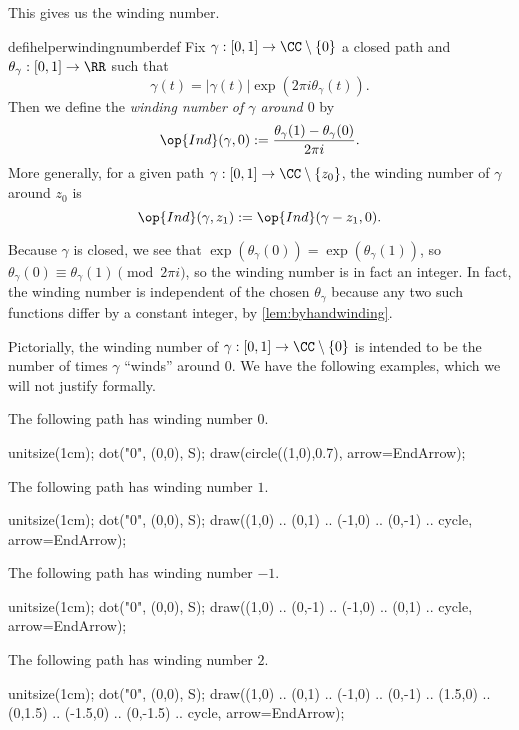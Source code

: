 This gives us the winding number.
\begin{restatable}{defihelper}{windingnumberdef} 
	Fix $\gamma:[0,1]\to\CC\setminus\{0\}$ a closed path and $\theta_\gamma:[0,1]\to\RR$ such that
	\[\gamma(t)=|\gamma(t)|\exp(2\pi i\theta_\gamma(t)).\]
	Then we define the \textit{winding number of $\gamma$ around $0$} by
	\[\op{Ind}(\gamma,0):=\frac{\theta_\gamma(1)-\theta_\gamma(0)}{2\pi i}.\]
	More generally, for a given path $\gamma:[0,1]\to\CC\setminus\{z_0\}$, the winding number of $\gamma$ around $z_0$ is
	\[\op{Ind}(\gamma,z_1):=\op{Ind}(\gamma-z_1,0).\]
\end{restatable}
\begin{remark}
	Because $\gamma$ is closed, we see that $\exp(\theta_\gamma(0))=\exp(\theta_\gamma(1))$, so $\theta_\gamma(0)\equiv\theta_\gamma(1)\pmod{2\pi i}$, so the winding number is in fact an integer. In fact, the winding number is independent of the chosen $\theta_\gamma$ because any two such functions differ by a constant integer, by \autoref{lem:byhandwinding}.
\end{remark}
Pictorially, the winding number of $\gamma:[0,1]\to\CC\setminus\{0\}$ is intended to be the number of times $\gamma$ ``winds'' around $0$. We have the following examples, which we will not justify formally.
\begin{example}
	The following path has winding number $0$.
	\begin{center}
		\begin{asy}
			unitsize(1cm);
			dot("$0$", (0,0), S);
			draw(circle((1,0),0.7), arrow=EndArrow);
		\end{asy}
	\end{center}
\end{example}
\begin{example}
	The following path has winding number $1$.
	\begin{center}
		\begin{asy}
			unitsize(1cm);
			dot("$0$", (0,0), S);
			draw((1,0) .. (0,1) .. (-1,0) .. (0,-1) .. cycle, arrow=EndArrow);
		\end{asy}
	\end{center}
\end{example}
\begin{example}
	The following path has winding number $-1$.
	\begin{center}
		\begin{asy}
			unitsize(1cm);
			dot("$0$", (0,0), S);
			draw((1,0) .. (0,-1) .. (-1,0) .. (0,1) .. cycle, arrow=EndArrow);
		\end{asy}
	\end{center}
\end{example}
\begin{example}
	The following path has winding number $2$.
	\begin{center}
		\begin{asy}
			unitsize(1cm);
			dot("$0$", (0,0), S);
			draw((1,0) .. (0,1) .. (-1,0) .. (0,-1) .. (1.5,0) .. (0,1.5) .. (-1.5,0) .. (0,-1.5) .. cycle, arrow=EndArrow);
		\end{asy}
	\end{center}
\end{example}